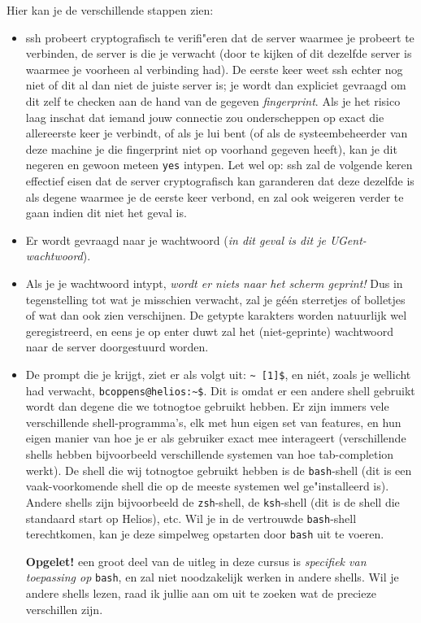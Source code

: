 \documentclass[a4paper,twoside,openany]{memoir}
\begin{document}
Hier kan je de verschillende stappen zien:
\begin{itemize}
\item ssh probeert cryptografisch te verifi"eren dat de server waarmee je
  probeert te verbinden, de server is die je verwacht (door te kijken of dit
    dezelfde server is waarmee je voorheen al verbinding had). De eerste keer
    weet ssh echter nog niet of dit al dan niet de juiste server is; je wordt
    dan expliciet gevraagd om dit zelf te checken aan de hand van de gegeven
    \emph{fingerprint}. Als je het risico laag inschat dat iemand jouw
    connectie zou onderscheppen op exact die allereerste keer je verbindt, of
    als je lui bent (of als de systeembeheerder van deze machine je die
    fingerprint niet op voorhand gegeven heeft), kan je dit negeren en gewoon
    meteen \verb!yes! intypen. Let wel op: ssh zal de volgende keren effectief
    eisen dat de server cryptografisch kan garanderen dat deze dezelfde is als
    degene waarmee je de eerste keer verbond, en zal ook weigeren verder te
    gaan indien dit niet het geval is.

\item Er wordt gevraagd naar je wachtwoord (\emph{in dit geval is dit je UGent-wachtwoord}).

\item Als je je wachtwoord intypt, \emph{wordt er niets naar het scherm
  geprint!} Dus in tegenstelling tot wat je misschien verwacht, zal je géén
    sterretjes of bolletjes of wat dan ook zien verschijnen. De getypte
    karakters worden natuurlijk wel geregistreerd, en eens je op enter
    duwt zal het (niet-geprinte) wachtwoord naar de server doorgestuurd worden.

\item De prompt die je krijgt, ziet er als volgt uit: \verb!~ [1]$!, en niét,
  zoals je wellicht had verwacht, \verb!bcoppens@helios:~$!. Dit is omdat er
    een andere shell gebruikt wordt dan degene die we totnogtoe gebruikt
    hebben. Er zijn immers vele verschillende shell-programma's, elk met hun
    eigen set van features, en hun eigen manier van hoe je er als gebruiker
    exact mee interageert (verschillende shells hebben bijvoorbeeld
    verschillende systemen van hoe tab-completion werkt). De shell die wij
    totnogtoe gebruikt hebben is de \verb!bash!-shell (dit is een
    vaak-voorkomende shell die op de meeste systemen wel ge"installeerd is).
    Andere shells zijn bijvoorbeeld de \verb!zsh!-shell, de \verb!ksh!-shell
    (dit is de shell die standaard start op Helios), etc. Wil je in de
    vertrouwde \verb!bash!-shell terechtkomen, kan je deze simpelweg opstarten
    door \verb!bash! uit te voeren.

    \textbf{Opgelet!} een groot deel van de uitleg in deze cursus is \emph{specifiek van toepassing op} \verb!bash!, en zal
    niet noodzakelijk werken in andere shells. Wil je andere shells lezen, raad ik jullie aan om uit te zoeken wat de precieze
    verschillen zijn.
\end{itemize}
\end{document}
